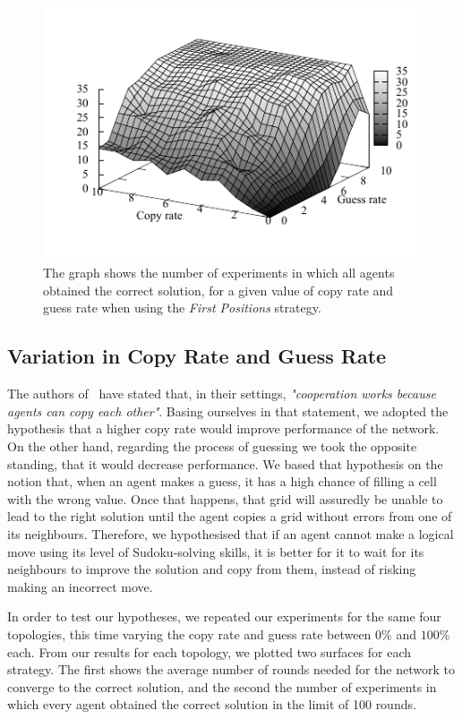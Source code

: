 \documentclass{article}
\begin{document}
\begin{figure}
\includegraphics[scale=1]{ijcai_sudoku/first_suc}
\caption{The graph shows the number of experiments in which all agents obtained the correct solution, for a given value of copy rate and guess rate when using the \emph{First Positions} strategy.
}
\label{fig:first_suc}
\end{figure}

\subsection{Variation in Copy Rate and Guess Rate}

The authors of~\cite{farenzena:collabem} have stated that, in their settings, {\em "cooperation works because agents can copy each other"}. Basing ourselves in that statement, we adopted the hypothesis that a higher copy rate would improve performance of the network. On the other hand, regarding the process of guessing we took the opposite standing, that it would decrease performance. We based that hypothesis on the notion that, when an agent makes a guess, it has a high chance of filling a cell with the wrong value. Once that happens, that grid will assuredly be unable to lead to the right solution until the agent copies a grid without errors from one of its neighbours. Therefore, we hypothesised that if an agent cannot make a logical move using its level of Sudoku-solving skills, it is better for it to wait for its neighbours to improve the solution and copy from them, instead of risking making an incorrect move.

In order to test our hypotheses, we repeated our experiments for the same four topologies, this time varying the copy rate and guess rate between $0\%$ and $100\%$ each. From our results for each topology, we plotted two surfaces for each strategy. The first shows the average number of rounds needed for the network to converge to the correct solution, and the second the number of experiments in which every agent obtained the correct solution in the limit of 100 rounds.
\end{document}
